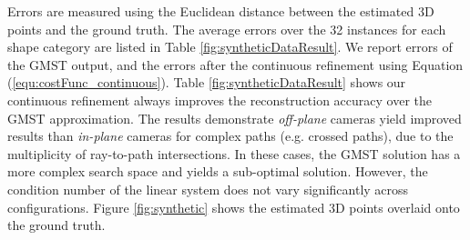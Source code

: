 Errors are measured using the Euclidean distance between the estimated 3D points and the ground truth. The average errors over the 32 instances for each shape category are listed in Table \ref{fig:syntheticDataResult}. We report errors of the GMST output, and the errors after the continuous refinement using Equation (\ref{equ:costFunc_continuous}).  Table \ref{fig:syntheticDataResult} shows our  continuous refinement always improves the reconstruction accuracy over the GMST approximation.  The results demonstrate    {\it off-plane} cameras yield improved results than {\it in-plane}  cameras  for  complex paths (e.g. crossed paths), due to the multiplicity of ray-to-path intersections. In these cases, the GMST solution has a more complex search space and yields a sub-optimal solution. However, the condition number of the linear system does not vary significantly across configurations. Figure \ref{fig:synthetic} shows the estimated 3D points overlaid onto the ground truth.

